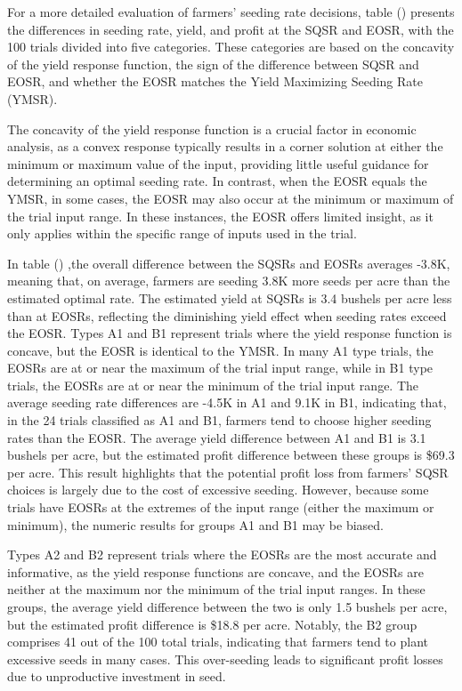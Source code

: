 \documentclass[
]{article}
\begin{document}
For a more detailed evaluation of farmers' seeding rate decisions, table
()
presents the differences in seeding rate, yield, and profit at the SQSR
and EOSR, with the 100 trials divided into five categories. These
categories are based on the concavity of the yield response function,
the sign of the difference between SQSR and EOSR, and whether the EOSR
matches the Yield Maximizing Seeding Rate (YMSR).

The concavity of the yield response function is a crucial factor in
economic analysis, as a convex response typically results in a corner
solution at either the minimum or maximum value of the input, providing
little useful guidance for determining an optimal seeding rate. In
contrast, when the EOSR equals the YMSR, in some cases, the EOSR may
also occur at the minimum or maximum of the trial input range. In these
instances, the EOSR offers limited insight, as it only applies within
the specific range of inputs used in the trial.

In table
()
,the overall difference between the SQSRs and EOSRs averages -3.8K,
meaning that, on average, farmers are seeding 3.8K more seeds per acre
than the estimated optimal rate. The estimated yield at SQSRs is 3.4
bushels per acre less than at EOSRs, reflecting the diminishing yield
effect when seeding rates exceed the EOSR. Types A1 and B1 represent
trials where the yield response function is concave, but the EOSR is
identical to the YMSR. In many A1 type trials, the EOSRs are at or near
the maximum of the trial input range, while in B1 type trials, the EOSRs
are at or near the minimum of the trial input range. The average seeding
rate differences are -4.5K in A1 and 9.1K in B1, indicating that, in the
24 trials classified as A1 and B1, farmers tend to choose higher seeding
rates than the EOSR. The average yield difference between A1 and B1 is
3.1 bushels per acre, but the estimated profit difference between these
groups is \$69.3 per acre. This result highlights that the potential
profit loss from farmers' SQSR choices is largely due to the cost of
excessive seeding. However, because some trials have EOSRs at the
extremes of the input range (either the maximum or minimum), the numeric
results for groups A1 and B1 may be biased.

Types A2 and B2 represent trials where the EOSRs are the most accurate
and informative, as the yield response functions are concave, and the
EOSRs are neither at the maximum nor the minimum of the trial input
ranges. In these groups, the average yield difference between the two is
only 1.5 bushels per acre, but the estimated profit difference is \$18.8
per acre. Notably, the B2 group comprises 41 out of the 100 total
trials, indicating that farmers tend to plant excessive seeds in many
cases. This over-seeding leads to significant profit losses due to
unproductive investment in seed.
\end{document}
